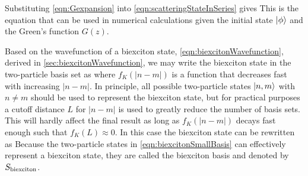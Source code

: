 Substituting \autoref{eqn:Gexpansion} into \autoref{eqn:scatteringStateInSeries} gives
This is the equation that can be used in numerical calculations given the initial state $| \phi \rangle$ and the Green's 
function $G(z)$. 

Based on the wavefunction of a biexciton state, \autoref{eqn:biexcitonWavefunction}, derived in 
\autoref{sec:biexcitonWavefunction}, we may write the biexciton state in the two-particle basis set as
where $f_{K}(|n-m|)$ is a function that decreases fast with increasing $|n-m|$. 
In principle, all possible two-particle states $| n, m \rangle$ with $n \neq m$ should be 
used to represent the biexciton state, but for practical purposes 
a cutoff distance $L$ for $|n-m|$ is used to greatly reduce the number of basis sets. This will hardly affect the final result
as long as  $f_{K}(|n-m|)$ decays fast enough such that $f_{K}(L) \approx 0$. In this case the biexciton state can be
rewritten as
Because the two-particle states in \autoref{eqn:biexcitonSmallBasis} can effectively represent a biexciton state, they 
are called the biexciton basis and denoted by $S_{\rm biexciton}$. 

